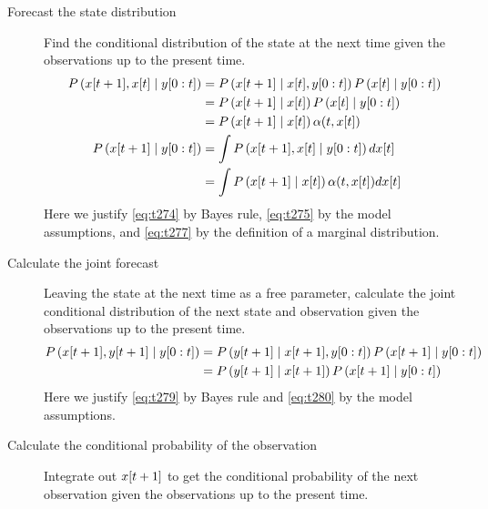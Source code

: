 \begin{description}
\item[Forecast the state distribution]  Find the
  conditional distribution of the state at the next time given the
  observations up to the present time.
\begin{align}
  \label{eq:t274}
  P\left({x}{[t+1]},{x}{[t]}\mid y[0:t] \right) &=
  P\left({x}{[t+1]}\mid {x}{[t]},y[0:t] \right)
  P\left({x}{[t]}\mid y[0:t] \right) \\
  \label{eq:t275}
  &= P\left({x}{[t+1]}\mid {x}{[t]} \right)
  P\left({x}{[t]}\mid y[0:t] \right) \\
  &= P\left({x}{[t+1]}\mid {x}{[t]} \right)
  \alpha(t,{x}{[t]})\\
  \label{eq:t277}
  P\left({x}{[t+1]}\mid y[0:t] \right) &= \int
  P\left({x}{[t+1]},{x}{[t]}\mid y[0:t] \right) d{x}{[t]}\\
  \label{eq:IFore}
  &= \int P \left({x}{[t+1]}\mid {x}{[t]} \right)
  \alpha(t,{x}{[t]}) d{x}{[t]}
\end{align}
Here we justify \eqref{eq:t274} by Bayes rule, \eqref{eq:t275} by
the model assumptions, and \eqref{eq:t277} by the definition of a
marginal distribution.
\item[Calculate the joint forecast] Leaving the state at the next time
  as a free parameter, calculate the joint conditional distribution of
  the next state and observation given the observations up to the
  present time.
\begin{align}
  \label{eq:t279}
  P\left({x}{[t+1]},{y}{[t+1]}\mid y[0:t] \right) &=
  P\left({y}{[t+1]}\mid {x}{[t+1]},y[0:t] \right)
  P\left({x}{[t+1]}\mid y[0:t] \right) \\
  \label{eq:t280}
  &=P\left({y}{[t+1]}\mid {x}{[t+1]} \right)
  P\left({x}{[t+1]}\mid y[0:t] \right)
\end{align}
Here we justify \eqref{eq:t279} by Bayes rule and \eqref{eq:t280} by
the model assumptions.
\item[Calculate the conditional probability of the observation]
  Integrate out ${x}{[t+1]}$ to get the conditional probability of
  the next observation given the observations up to the present time.
\begin{equation}

\end{equation}
\end{description}
